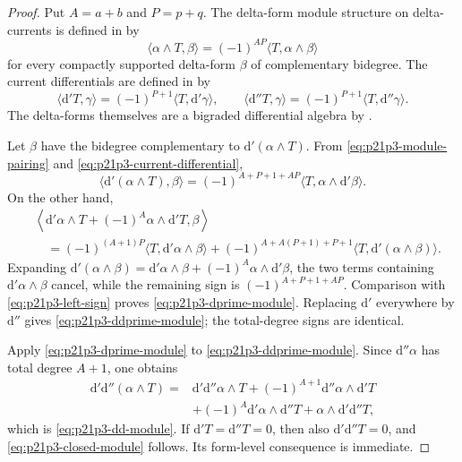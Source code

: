 
\begin{proof}
Put \(A=a+b\) and \(P=p+q\).  The delta-form module structure on
delta-currents is defined in \cite[\S6.4, equation~(6.4.1)]{GK17} by
\begin{equation}
 \langle\alpha\wedge T,\beta\rangle
 =(-1)^{AP}\langle T,\alpha\wedge\beta\rangle
 \label{eq:p21p3-module-pairing}
\end{equation}
for every compactly supported delta-form \(\beta\) of complementary
bidegree.  The current differentials are defined in \cite[\S6.9]{GK17} by
\begin{equation}
 \langle\mathrm d'T,\gamma\rangle
 =(-1)^{P+1}\langle T,\mathrm d'\gamma\rangle,
 \qquad
 \langle\mathrm d''T,\gamma\rangle
 =(-1)^{P+1}\langle T,\mathrm d''\gamma\rangle.
 \label{eq:p21p3-current-differential}
\end{equation}
The delta-forms themselves are a bigraded differential algebra by
\cite[\S4.13 and Proposition~4.15(iii)]{GK17}.

Let \(\beta\) have the bidegree complementary to
\(\mathrm d'(\alpha\wedge T)\).  From
\eqref{eq:p21p3-module-pairing} and
\eqref{eq:p21p3-current-differential},
\begin{equation}
 \langle\mathrm d'(\alpha\wedge T),\beta\rangle
 =(-1)^{A+P+1+AP}
   \langle T,\alpha\wedge\mathrm d'\beta\rangle.
 \label{eq:p21p3-left-sign}
\end{equation}
On the other hand,
\begin{align*}
 &\left\langle
   \mathrm d'\alpha\wedge T+(-1)^A\alpha\wedge\mathrm d'T,
   \beta\right\rangle\\
 &\quad=(-1)^{(A+1)P}
   \langle T,\mathrm d'\alpha\wedge\beta\rangle
   +(-1)^{A+A(P+1)+P+1}
   \langle T,\mathrm d'(\alpha\wedge\beta)\rangle.
\end{align*}
Expanding
\(
 \mathrm d'(\alpha\wedge\beta)
 =\mathrm d'\alpha\wedge\beta+(-1)^A
   \alpha\wedge\mathrm d'\beta
\), the two terms containing
\(\mathrm d'\alpha\wedge\beta\) cancel, while the remaining sign is
\((-1)^{A+P+1+AP}\).  Comparison with
\eqref{eq:p21p3-left-sign} proves
\eqref{eq:p21p3-dprime-module}.  Replacing \(\mathrm d'\) everywhere by
\(\mathrm d''\) gives \eqref{eq:p21p3-ddprime-module}; the total-degree
signs are identical.

Apply \eqref{eq:p21p3-dprime-module} to
\eqref{eq:p21p3-ddprime-module}.  Since \(\mathrm d''\alpha\) has total
degree \(A+1\), one obtains
\begin{align*}
 \mathrm d'\mathrm d''(\alpha\wedge T)
 ={}&\mathrm d'\mathrm d''\alpha\wedge T
   +(-1)^{A+1}\mathrm d''\alpha\wedge\mathrm d'T\\
 &+(-1)^A\mathrm d'\alpha\wedge\mathrm d''T
   +\alpha\wedge\mathrm d'\mathrm d''T,
\end{align*}
which is \eqref{eq:p21p3-dd-module}.  If
\(\mathrm d'T=\mathrm d''T=0\), then also
\(\mathrm d'\mathrm d''T=0\), and
\eqref{eq:p21p3-closed-module} follows.  Its form-level consequence is
immediate.


\end{proof}
